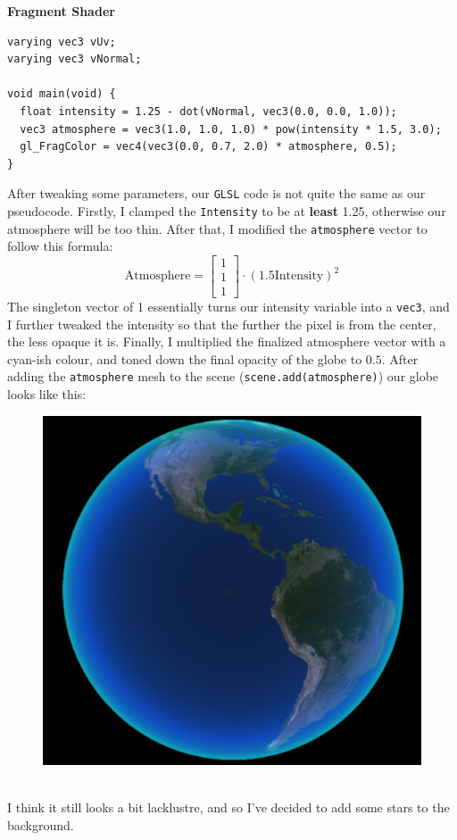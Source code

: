 \textbf{Fragment Shader}
\begin{lstlisting}
varying vec3 vUv;
varying vec3 vNormal;

void main(void) {
  float intensity = 1.25 - dot(vNormal, vec3(0.0, 0.0, 1.0));
  vec3 atmosphere = vec3(1.0, 1.0, 1.0) * pow(intensity * 1.5, 3.0);
  gl_FragColor = vec4(vec3(0.0, 0.7, 2.0) * atmosphere, 0.5);
}
\end{lstlisting}
After tweaking some parameters, our \verb|GLSL| code is not quite the same as our pseudocode. Firstly, I clamped the \verb|Intensity| to be at \textbf{least} 1.25, otherwise our atmosphere will be too thin. After that, I modified the \verb|atmosphere| vector to follow this formula: \\
$$\textrm{Atmosphere} = \begin{bmatrix}1 \\ 1 \\ 1\end{bmatrix} \cdot (1.5\textrm{Intensity})^2$$
\newpage
The singleton vector of 1 essentially turns our intensity variable into a \verb|vec3|, and I further tweaked the intensity so that the further the pixel is from the center, the less opaque it is. Finally, I multiplied the finalized atmosphere vector with a cyan-ish colour, and toned down the final opacity of the globe to $0.5$. After adding the \verb|atmosphere| mesh to the scene (\verb|scene.add(atmosphere)|) our globe looks like this: \\
\begin{figure}[ht]
\centering
\includegraphics[width=0.5\linewidth]{images/atmosphere}
\caption{}
\label{fig:atmosphere}
\end{figure}
\\
I think it still looks a bit lacklustre, and so I've decided to add some stars to the background.

